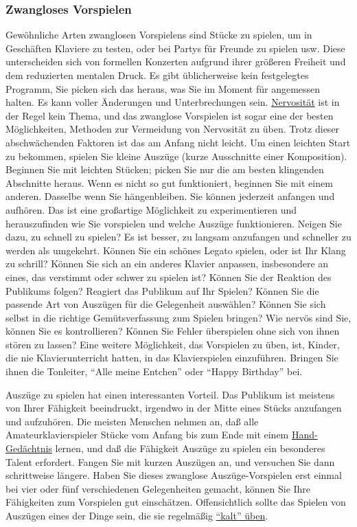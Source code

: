 
\subsubsection{Zwangloses Vorspielen}
\label{c1iii14e}

Gewöhnliche Arten zwanglosen Vorspielens sind Stücke zu spielen, um in Geschäften Klaviere zu testen, oder bei Partys für Freunde zu spielen usw.
Diese unterscheiden sich von formellen Konzerten aufgrund ihrer größeren Freiheit und dem reduzierten mentalen Druck.
Es gibt üblicherweise kein festgelegtes Programm, Sie picken sich das heraus, was Sie im Moment für angemessen halten.
Es kann voller Änderungen und Unterbrechungen sein.
\hyperref[c1iii15]{Nervosität} ist in der Regel kein Thema, und das zwanglose Vorspielen ist sogar eine der besten Möglichkeiten, Methoden zur Vermeidung von Nervosität zu üben.
Trotz dieser abschwächenden Faktoren ist das am Anfang nicht leicht.
Um einen leichten Start zu bekommen, spielen Sie kleine Auszüge (kurze Ausschnitte einer Komposition).
Beginnen Sie mit leichten Stücken; picken Sie nur die am besten klingenden Abschnitte heraus.
Wenn es nicht so gut funktioniert, beginnen Sie mit einem anderen. Dasselbe wenn Sie hängenbleiben.
Sie können jederzeit anfangen und aufhören.
Das ist eine großartige Möglichkeit zu experimentieren und herauszufinden wie Sie vorspielen und welche  Auszüge funktionieren.
Neigen Sie dazu, zu schnell zu spielen?
Es ist besser, zu langsam anzufangen und schneller zu werden als umgekehrt.
Können Sie ein schönes Legato spielen, oder ist Ihr Klang zu schrill?
Können Sie sich an ein anderes Klavier anpassen, insbesondere an eines, das verstimmt oder schwer zu spielen ist?
Können Sie der Reaktion des Publikums folgen?
Reagiert das Publikum auf Ihr Spielen?
Können Sie die passende Art von Auszügen für die Gelegenheit auswählen?
Können Sie sich selbst in die richtige Gemütsverfassung zum Spielen bringen?
Wie nervös sind Sie, können Sie es kontrollieren?
Können Sie Fehler überspielen ohne sich von ihnen stören zu lassen?
Eine weitere Möglichkeit, das Vorspielen zu üben, ist, Kinder, die nie Klavierunterricht hatten, in das Klavierspielen einzuführen.
Bringen Sie ihnen die Tonleiter, \enquote{Alle meine Entchen} oder \enquote{Happy Birthday} bei.

Auszüge zu spielen hat einen interessanten Vorteil. Das Publikum ist meistens von Ihrer Fähigkeit beeindruckt, irgendwo in der Mitte eines Stücks anzufangen und aufzuhören.
Die meisten Menschen nehmen an, daß alle Amateurklavierspieler Stücke vom Anfang bis zum Ende mit einem \hyperref[c1iii6d]{Hand-Gedächtnis} lernen, und daß die Fähigkeit Auszüge zu spielen ein besonderes Talent erfordert.
Fangen Sie mit kurzen Auszügen an, und versuchen Sie dann schrittweise längere.
Haben Sie dieses zwanglose Auszüge-Vorspielen erst einmal bei vier oder fünf verschiedenen Gelegenheiten gemacht, können Sie Ihre Fähigkeiten zum Vorspielen gut einschätzen.
Offensichtlich sollte das Spielen von Auszügen eines der Dinge sein, die sie regelmäßig \hyperref[c1iii6g]{\enquote{kalt} üben}.

